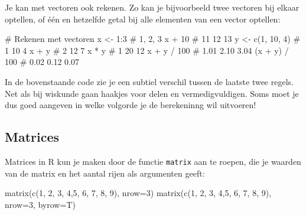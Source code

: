 \documentclass[
  a4paper,
]{scrbook}
\newenvironment{Shaded}{\begin{snugshade}}{\end{snugshade}}
\newcommand{\AttributeTok}[1]{\textcolor[rgb]{0.40,0.45,0.13}{#1}}
\newcommand{\CommentTok}[1]{\textcolor[rgb]{0.37,0.37,0.37}{#1}}
\newcommand{\DecValTok}[1]{\textcolor[rgb]{0.68,0.00,0.00}{#1}}
\newcommand{\FunctionTok}[1]{\textcolor[rgb]{0.28,0.35,0.67}{#1}}
\newcommand{\NormalTok}[1]{\textcolor[rgb]{0.00,0.23,0.31}{#1}}
\newcommand{\OtherTok}[1]{\textcolor[rgb]{0.00,0.23,0.31}{#1}}
\newcommand{\SpecialCharTok}[1]{\textcolor[rgb]{0.37,0.37,0.37}{#1}}
\theoremstyle{definition}
\theoremstyle{remark}
\begin{document}
Je kan met vectoren ook rekenen. Zo kan je bijvoorbeeld twee vectoren
bij elkaar optellen, of één en hetzelfde getal bij alle elementen van
een vector optellen:

\begin{Shaded}
\begin{Highlighting}[]
\CommentTok{\# Rekenen met vectoren}
\NormalTok{x }\OtherTok{\textless{}{-}} \DecValTok{1}\SpecialCharTok{:}\DecValTok{3}           \CommentTok{\# 1, 2, 3}
\NormalTok{x }\SpecialCharTok{+} \DecValTok{10}             \CommentTok{\# 11 12 13}
\NormalTok{y }\OtherTok{\textless{}{-}} \FunctionTok{c}\NormalTok{(}\DecValTok{1}\NormalTok{, }\DecValTok{10}\NormalTok{, }\DecValTok{4}\NormalTok{)   }\CommentTok{\# 1 10 4}
\NormalTok{x }\SpecialCharTok{+}\NormalTok{ y              }\CommentTok{\# 2 12  7}
\NormalTok{x }\SpecialCharTok{*}\NormalTok{ y              }\CommentTok{\# 1 20 12}
\NormalTok{x }\SpecialCharTok{+}\NormalTok{ y }\SpecialCharTok{/} \DecValTok{100}        \CommentTok{\# 1.01 2.10 3.04}
\NormalTok{(x }\SpecialCharTok{+}\NormalTok{ y) }\SpecialCharTok{/} \DecValTok{100}      \CommentTok{\# 0.02 0.12 0.07}
\end{Highlighting}
\end{Shaded}

In de bovenstaande code zie je een subtiel verschil tussen de laatste
twee regels. Net als bij wiskunde gaan haakjes voor delen en
vermedigvuldigen. Soms moet je dus goed aangeven in welke volgorde je de
berekeninng wil uitvoeren!

\subsection{Matrices}\label{matrices}

Matrices in R kun je maken door de functie \texttt{matrix} aan te
roepen, die je waarden van de matrix en het aantal rijen als argumenten
geeft:

\begin{Shaded}
\begin{Highlighting}[]
\FunctionTok{matrix}\NormalTok{(}\FunctionTok{c}\NormalTok{(}\DecValTok{1}\NormalTok{, }\DecValTok{2}\NormalTok{, }\DecValTok{3}\NormalTok{, }\DecValTok{4}\NormalTok{,}\DecValTok{5}\NormalTok{, }\DecValTok{6}\NormalTok{, }\DecValTok{7}\NormalTok{, }\DecValTok{8}\NormalTok{, }\DecValTok{9}\NormalTok{), }\AttributeTok{nrow=}\DecValTok{3}\NormalTok{)}
\FunctionTok{matrix}\NormalTok{(}\FunctionTok{c}\NormalTok{(}\DecValTok{1}\NormalTok{, }\DecValTok{2}\NormalTok{, }\DecValTok{3}\NormalTok{, }\DecValTok{4}\NormalTok{,}\DecValTok{5}\NormalTok{, }\DecValTok{6}\NormalTok{, }\DecValTok{7}\NormalTok{, }\DecValTok{8}\NormalTok{, }\DecValTok{9}\NormalTok{), }\AttributeTok{nrow=}\DecValTok{3}\NormalTok{, }\AttributeTok{byrow=}\NormalTok{T)}
\end{Highlighting}
\end{Shaded}
\end{document}
